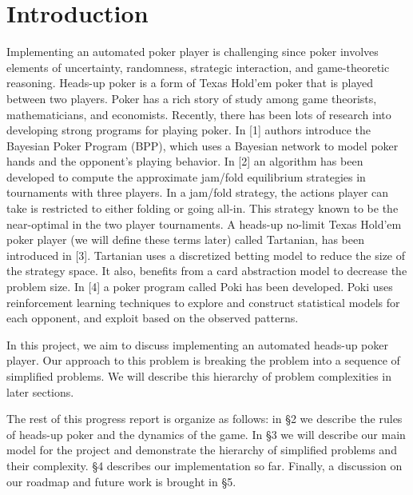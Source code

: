 \section{Introduction}\label{intro}
Implementing an automated poker player is challenging since poker involves
elements of uncertainty, randomness, strategic interaction, and game-theoretic
reasoning. Heads-up poker is a form of Texas Hold'em poker that is played 
between two players. Poker 
has a rich story of study among game theorists, mathematicians, 
and economists. Recently, there has been lots  of research into 
developing strong programs for playing poker. In [1] authors introduce
the Bayesian Poker Program (BPP), which uses a Bayesian network to model 
poker hands and the opponent's playing behavior. In [2] an algorithm has been developed
to compute the approximate jam/fold equilibrium strategies in tournaments 
with three players. In a jam/fold strategy, the actions player can take is restricted to 
either folding or going all-in. This strategy known to be 
the near-optimal in the two player tournaments. A heads-up no-limit Texas 
Hold'em poker player (we will define these terms later) called Tartanian, 
has been introduced in [3]. Tartanian
uses a discretized betting model to reduce the size of the strategy space.
It also, benefits from a card abstraction model to decrease the problem size.
In [4] a poker program called Poki has been developed. Poki uses reinforcement 
learning techniques to explore and construct statistical models for each opponent,
and exploit based on the observed patterns. 

In this project, we aim to discuss implementing an 
automated heads-up poker player. Our approach to this problem is breaking
the problem into a sequence of simplified problems. We will describe this hierarchy
of problem complexities in later sections.

The rest of this progress report is organize as follows: in \S 2 we describe the
rules of heads-up poker and the dynamics of the game. In \S 3 we will
describe our main model for the project and 
demonstrate the hierarchy of simplified problems and their complexity.
\S 4 describes our implementation
so far. Finally, a discussion on our roadmap and future work is brought in \S5.
